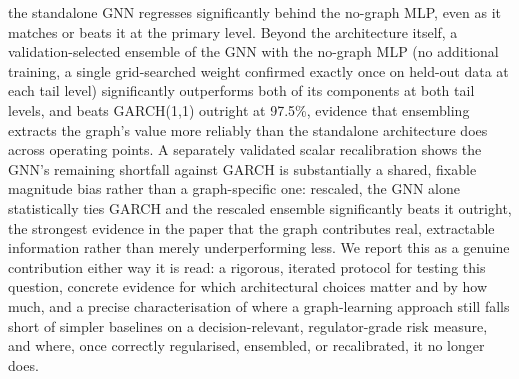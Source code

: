 \documentclass{llncs}
\begin{document}
the standalone GNN regresses significantly behind the no-graph MLP, even as it
matches or beats it at the primary level. Beyond the architecture itself, a
validation-selected ensemble of the GNN with the no-graph MLP (no additional
training, a single grid-searched weight confirmed exactly once on held-out
data at each tail level) significantly outperforms both of its components at
both tail levels, and beats GARCH(1,1) outright at 97.5\%, evidence that
ensembling extracts the graph's value more reliably than the standalone
architecture does across operating points. A separately validated scalar
recalibration shows the GNN's remaining shortfall against GARCH is
substantially a shared, fixable magnitude bias rather than a graph-specific
one: rescaled, the GNN alone statistically ties GARCH and the rescaled
ensemble significantly beats it outright, the strongest evidence in the paper
that the graph contributes real, extractable information rather than merely
underperforming less. We report this as a genuine contribution either way it
is read: a rigorous, iterated protocol for testing this question, concrete
evidence for which architectural choices matter and by how much, and a
precise characterisation of where a graph-learning approach still falls short
of simpler baselines on a decision-relevant, regulator-grade risk
measure, and where, once correctly regularised, ensembled, or recalibrated,
it no longer does.



\end{document}
